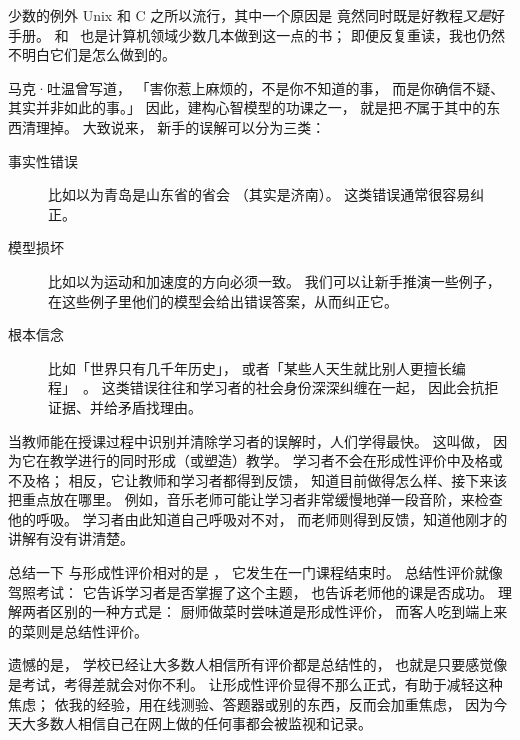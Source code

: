 \begin{aside}{少数的例外}
  Unix 和 C 之所以流行，其中一个原因是
  \cite{Kern1978,Kern1983,Kern1988}
  竟然同时既是好教程\emph{又是}好手册。
  \cite{Fehi2008} 和~\cite{Ray2014} 也是计算机领域少数几本做到这一点的书；
  即便反复重读，我也仍然不明白它们是怎么做到的。
\end{aside}


马克·吐温曾写道，
「害你惹上麻烦的，不是你不知道的事，
而是你确信不疑、其实并非如此的事。」
因此，建构心智模型的功课之一，
就是把\emph{不}属于其中的东西清理掉。
大致说来，
新手的误解可以分为三类：

\begin{description}

\item[事实性错误]
  比如以为青岛是山东省的省会
  （其实是济南）。
  这类错误通常很容易纠正。

\item[模型损坏]
  比如以为运动和加速度的方向必须一致。
  我们可以让新手推演一些例子，
  在这些例子里他们的模型会给出错误答案，从而纠正它。

\item[根本信念]
  比如「世界只有几千年历史」，
  或者「某些人天生就比别人更擅长编程」~\cite{Guzd2015b,Pati2016}。
  这类错误往往和学习者的社会身份深深纠缠在一起，
  因此会抗拒证据、并给矛盾找理由。

\end{description}

当教师能在授课过程中识别并清除学习者的误解时，人们学得最快。
这叫做，
因为它在教学进行的同时形成（或塑造）教学。
学习者不会在形成性评价中及格或不及格；
相反，它让教师和学习者都得到反馈，
知道目前做得怎么样、接下来该把重点放在哪里。
例如，音乐老师可能让学习者非常缓慢地弹一段音阶，来检查他的呼吸。
学习者由此知道自己呼吸对不对，
而老师则得到反馈，知道他刚才的讲解有没有讲清楚。

\begin{aside}{总结一下}
  与形成性评价相对的是
  ，
  它发生在一门课程结束时。
  总结性评价就像驾照考试：
  它告诉学习者是否掌握了这个主题，
  也告诉老师他的课是否成功。
  理解两者区别的一种方式是：
  厨师做菜时尝味道是形成性评价，
  而客人吃到端上来的菜则是总结性评价。

  遗憾的是，
  学校已经让大多数人相信所有评价都是总结性的，
  也就是只要感觉像是考试，考得差就会对你不利。
  让形成性评价显得不那么正式，有助于减轻这种焦虑；
  依我的经验，用在线测验、答题器或别的东西，反而会加重焦虑，
  因为今天大多数人相信自己在网上做的任何事都会被监视和记录。
\end{aside}
  
